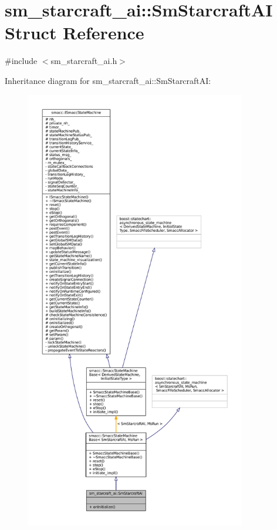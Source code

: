 \hypertarget{structsm__starcraft__ai_1_1SmStarcraftAI}{}\section{sm\+\_\+starcraft\+\_\+ai\+:\+:Sm\+Starcraft\+AI Struct Reference}
\label{structsm__starcraft__ai_1_1SmStarcraftAI}


{\ttfamily \#include $<$sm\+\_\+starcraft\+\_\+ai.\+h$>$}



Inheritance diagram for sm\+\_\+starcraft\+\_\+ai\+:\+:Sm\+Starcraft\+AI\+:
\nopagebreak
\begin{figure}[H]
\begin{center}
\leavevmode
\includegraphics[height=550pt]{structsm__starcraft__ai_1_1SmStarcraftAI__inherit__graph}
\end{center}
\end{figure}


